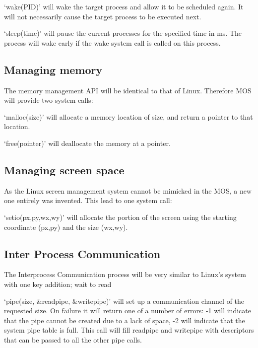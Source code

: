 \documentclass[a4paper]{report}
\begin{document}
\vspace{1.5mm}
\noindent
`wake(PID)' will wake the target process and allow it to be scheduled again. It will not necessarily cause the target process to be executed next.

\vspace{1.5mm}
\noindent
`sleep(time)' will pause the current processes for the specified time in ms. The process will wake early if the wake system call is called on this process.

\subsection{Managing memory}

The memory management API will be identical to that of Linux. Therefore MOS will provide two system calls:

\vspace{1.5mm}
\noindent
`malloc(size)' will allocate a memory location of size, and return a pointer to that location.

\vspace{1.5mm}
\noindent
`free(pointer)' will deallocate the memory at a pointer.

\subsection{Managing screen space}

As the Linux screen management system cannot be mimicked in the MOS, a new one entirely was invented. This lead to one system call:

\vspace{1.5mm}
\noindent
`setio(px,py,wx,wy)' will allocate the portion of the screen using the starting coordinate (px,py) and the size (wx,wy).


\subsection{Inter Process Communication}

The Interprocess Communication process will be very similar to Linux's system with one key addition; wait to read

\vspace{1.5mm}
\noindent
`pipe(size, \&readpipe, \&writepipe)' will set up a communication channel of the requested size. On failure it will return one of a number of errors: -1 will indicate that the pipe cannot be created due to a lack of space, -2 will indicate that the system pipe table is full. This call will fill readpipe and writepipe with descriptors that can be passed to all the other pipe calls.
\end{document}
